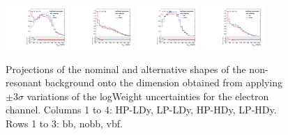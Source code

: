 \begin{figure}[htbp]
  \includegraphics[width=0.21\textwidth]{fig/uncertainties/systs_nonRes_e_HP_vbf_LDy_logWeight_ProjY.pdf}
  \includegraphics[width=0.21\textwidth]{fig/uncertainties/systs_nonRes_e_LP_vbf_LDy_logWeight_ProjY.pdf}
  \includegraphics[width=0.21\textwidth]{fig/uncertainties/systs_nonRes_e_HP_vbf_HDy_logWeight_ProjY.pdf}
  \includegraphics[width=0.21\textwidth]{fig/uncertainties/systs_nonRes_e_LP_vbf_HDy_logWeight_ProjY.pdf}\\
  \caption{
    Projections of the nominal and alternative shapes of the non-resonant background onto the \MJ dimension obtained from applying $\pm3\sigma$ variations of the logWeight uncertainties for the electron channel.
    Columns 1 to 4: HP-LDy, LP-LDy, HP-HDy, LP-HDy.
    Rows 1 to 3: bb, nobb, vbf.
  }
  \label{fig:systNonResMJ_logWeight}
\end{figure}

